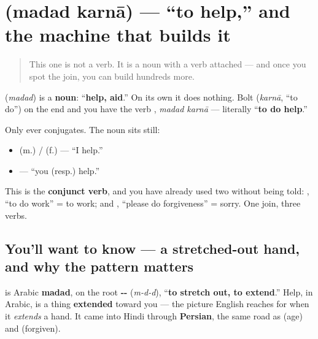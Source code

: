 \section[\texorpdfstring{\hi{मदद} \hi{करना} / \hi{मदद} … (madad karnā …)}{मदद करना / मदद … (madad karnā …)}]{  (madad karnā) — \textquotedblleft{}to help,\textquotedblright{} and the machine that builds it}

\label{lesson:HI-C35-madad}



\begin{quote}
This one is not a verb. It is a noun with a verb attached — and once you spot the join, you can build hundreds more.
\end{quote}

\begin{cousinweb}
\textbf{} (\emph{madad}) is a \textbf{noun}: \textquotedblleft{}\textbf{help, aid}.\textquotedblright{} On its own it does nothing. Bolt \textbf{} (\emph{karnā}, \textquotedblleft{}to do\textquotedblright{}) on the end and you have the verb \textbf{ }, \emph{madad karnā} — literally \textquotedblleft{}\textbf{to do help}.\textquotedblright{}

Only \textbf{} ever conjugates. The noun sits still:

\begin{itemize}
\raggedright
  \item \textbf{   } (m.) / \textbf{   } (f.) — \textquotedblleft{}I help.\textquotedblright{}
  \item \textbf{   } — \textquotedblleft{}you (resp.) help.\textquotedblright{}
\end{itemize}

This is the \textbf{conjunct verb}, and you have already used two without being told: \textbf{ }, \textquotedblleft{}to do work\textquotedblright{} = to work; and \textbf{ }, \textquotedblleft{}please do forgiveness\textquotedblright{} = sorry. One join, three verbs.
\end{cousinweb}

\subsection*{You'll want to know — a stretched-out hand, and why the pattern matters}
\textbf{} is Arabic \textbf{madad}, on the root \textbf{--} (\emph{m-d-d}), \textquotedblleft{}\textbf{to stretch out, to extend}.\textquotedblright{} Help, in Arabic, is a thing \textbf{extended} toward you — the picture English reaches for when it \emph{extends} a hand. It came into Hindi through \textbf{Persian}, the same road as \textbf{} (age) and \textbf{} (forgiven).

